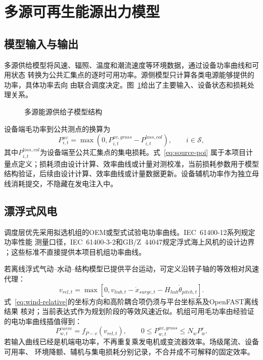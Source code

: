\section{多源可再生能源出力模型}
\label{sec:renewables-load}

\subsection{模型输入与输出}

多源供给模型将风速、辐照、温度和潮流速度等环境数据，通过设备功率曲线和可用状态
转换为公共汇集点的逐时可用功率。源侧模型只计算各类电源能够提供的功率，具体功率去向
由联合调度决定。图~\ref{fig:source-model}给出了主要输入、设备状态和损耗处理关系。
\begin{figure}[H]
\centering
\resizebox{0.96\textwidth}{!}{}
\caption{多源能源供给子模型结构}
\label{fig:source-model}
\end{figure}

设备端毛功率到公共测点的换算为
\begin{equation}
P_{i,t}^{av}=\max\!\left(0,
P_{i,t}^{av,gross}-P_{i,t}^{loss,col}\right),
\qquad i\in\mathcal S,
\label{eq:source-poi}
\end{equation}
其中$P_{i,t}^{loss,col}$为设备端至公共汇集点的集电损耗。式~\eqref{eq:source-poi}
属于本项目计量点定义；损耗须由设计计算、效率曲线或计量对测校准，当前损耗参数用于模型结构验证，后续由设计计算、效率曲线或计量数据更新。设备辅机功率作为独立母线消耗提交，不隐藏在发电注入中。

\subsection{漂浮式风电}

调度层优先采用拟选机组的OEM或型式试验电功率曲线。IEC~61400-12系列规定功率性能
测量口径，IEC~61400-3-2和GB/Z~44047规定浮式海上风机的设计边界
\cite{iec61400-12,iec61400-3-2,gbz44047}；这些标准不直接提供本项目机组功率曲线。

若离线浮式气动--水动--结构模型已提供平台运动，可定义沿转子轴的等效相对风速代理：
\begin{equation}
v_{rel,t}=\max\!\left[0,
v_{hub,t}-\dot x_{surge,t}-H_{hub}\dot\theta_{pitch,t}\right].
\label{eq:wind-relative}
\end{equation}
式~\eqref{eq:wind-relative}的坐标方向和高阶耦合项仍须与平台坐标系及OpenFAST离线结果
核对；当前表达式作为规划阶段的等效风速近似。机组可用毛功率由经验证的电功率曲线插值得到：
\begin{equation}
P_{w,t}^{curve}=f_{P-v}(v_{rel,t}),\qquad
0\le P_{w,t}^{av,gross}\le N_wP_w^r.
\label{eq:wind-curve}
\end{equation}
若输入曲线已经是机端电功率，不再重复乘发电机或变流器效率。场级尾流、设备可用率、
环境降额、辅机与集电损耗分别记录，不合并成不可解释的固定效率。

